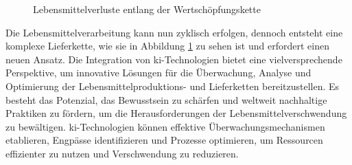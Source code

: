 \begin{figure}[h]
    \centering
    \caption[Lebensmittelverluste entlang der Wertschöpfungskette]{Lebensmittelverluste entlang der Wertschöpfungskette \cite{ProjektREIF.}}
    \label{fig:Verlustkette}
\end{figure}

Die Lebensmittelverarbeitung kann nun zyklisch erfolgen, dennoch entsteht eine komplexe Lieferkette, wie sie in Abbildung \ref{fig:Verlustkette} zu sehen ist und erfordert einen neuen Ansatz. Die Integration von \ac{ki}-Technologien bietet eine vielversprechende Perspektive, um innovative Lösungen für die Überwachung, Analyse und Optimierung der Lebensmittel\-produktions- und Lieferketten bereitzustellen. Es besteht das Potenzial, das Bewusstsein zu schärfen und weltweit nachhaltige Praktiken zu fördern, um die Herausforderungen der Lebensmittelverschwendung zu bewältigen. \ac{ki}-Technologien können effektive Überwachungsmechanismen etablieren, Engpässe identifizieren und Prozesse optimieren, um Ressourcen effizienter zu nutzen und Verschwendung zu reduzieren.

